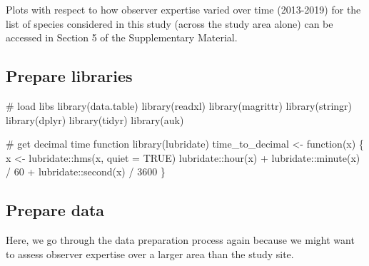 \documentclass[]{article}
\newenvironment{Shaded}{}{}
\newcommand{\CommentTok}[1]{\textcolor[rgb]{0.00,0.50,0.00}{#1}}
\newcommand{\ControlFlowTok}[1]{\textcolor[rgb]{0.00,0.00,1.00}{#1}}
\newcommand{\DataTypeTok}[1]{#1}
\newcommand{\DecValTok}[1]{#1}
\newcommand{\KeywordTok}[1]{\textcolor[rgb]{0.00,0.00,1.00}{#1}}
\newcommand{\NormalTok}[1]{#1}
\newcommand{\OperatorTok}[1]{#1}
\newcommand{\OtherTok}[1]{\textcolor[rgb]{1.00,0.25,0.00}{#1}}
\newcommand{\StringTok}[1]{\textcolor[rgb]{0.00,0.50,0.50}{#1}}
\begin{document}
Plots with respect to how observer expertise varied over time (2013-2019) for the list of species considered in this study (across the study area alone) can be accessed in Section 5 of the Supplementary Material.

\hypertarget{prepare-libraries-1}{%
\subsection{Prepare libraries}\label{prepare-libraries-1}}

\begin{Shaded}
\begin{Highlighting}[numbers=left,,]

\CommentTok{# load libs}
\KeywordTok{library}\NormalTok{(data.table)}
\KeywordTok{library}\NormalTok{(readxl)}
\KeywordTok{library}\NormalTok{(magrittr)}
\KeywordTok{library}\NormalTok{(stringr)}
\KeywordTok{library}\NormalTok{(dplyr)}
\KeywordTok{library}\NormalTok{(tidyr)}
\KeywordTok{library}\NormalTok{(auk)}

\CommentTok{# get decimal time function}
\KeywordTok{library}\NormalTok{(lubridate)}
\NormalTok{time_to_decimal <-}\StringTok{ }\ControlFlowTok{function}\NormalTok{(x) \{}
\NormalTok{  x <-}\StringTok{ }\NormalTok{lubridate}\OperatorTok{::}\KeywordTok{hms}\NormalTok{(x, }\DataTypeTok{quiet =} \OtherTok{TRUE}\NormalTok{)}
\NormalTok{  lubridate}\OperatorTok{::}\KeywordTok{hour}\NormalTok{(x) }\OperatorTok{+}\StringTok{ }\NormalTok{lubridate}\OperatorTok{::}\KeywordTok{minute}\NormalTok{(x) }\OperatorTok{/}\StringTok{ }\DecValTok{60} \OperatorTok{+}\StringTok{ }\NormalTok{lubridate}\OperatorTok{::}\KeywordTok{second}\NormalTok{(x) }\OperatorTok{/}\StringTok{ }\DecValTok{3600}
\NormalTok{\}}
\end{Highlighting}
\end{Shaded}

\hypertarget{prepare-data}{%
\subsection{Prepare data}\label{prepare-data}}

Here, we go through the data preparation process again because we might want to assess observer expertise over a larger area than the study site.
\end{document}
